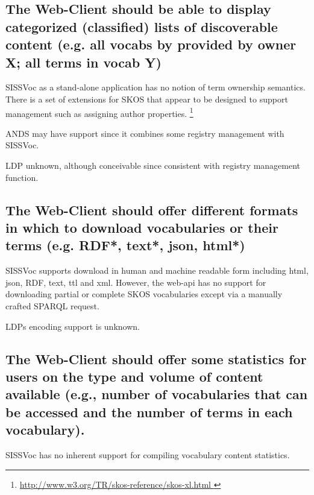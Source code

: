 \documentclass[10pt,a4paper]{article}
\begin{document}
\begin{flushleft}

\subsection{ The Web-Client should be able to display categorized
(classified) lists of discoverable content (e.g. all vocabs by provided by
owner X; all terms in vocab Y) }


  \item[] SISSVoc as a stand-alone application has no notion of term ownership semantics. There is
  a set of extensions for SKOS that appear to be designed to support management such as 
  assigning author properties. 
  \footnote  { \url { http://www.w3.org/TR/skos-reference/skos-xl.html } }    

  \item[] ANDS may have support since it combines some registry management with SISSVoc. 

  \item LDP unknown, although conceivable since consistent with registry management function.


\subsection{ The Web-Client should offer different formats in which to
download vocabularies or their terms (e.g. RDF*, text*, json, html*) }

  \item SISSVoc supports download in human and machine readable form including html, 
  json, RDF, text, ttl and xml. However, the web-api has no support for downloading 
  partial or complete SKOS vocabularies except via a manually crafted SPARQL request.

  \item LDPs encoding support is unknown.

\subsection{ The Web-Client should offer some statistics for users on the
type and volume of content available (e.g., number of vocabularies that can be
accessed and the number of terms in each vocabulary).  }
 

  \item SISSVoc has no inherent support for compiling vocabulary content statistics.


\end{flushleft}
\end{document}
